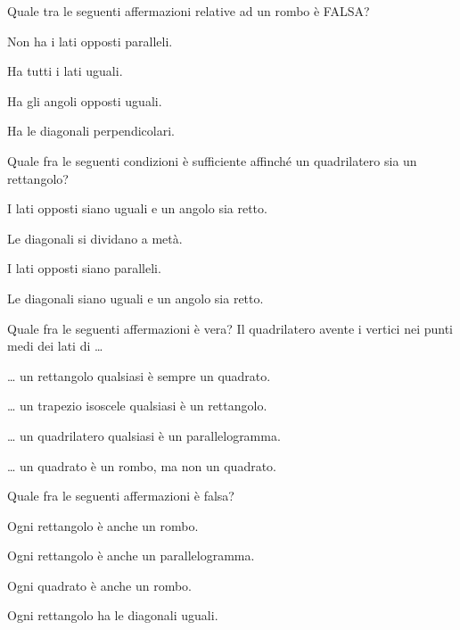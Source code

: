 \begin{esercizio}
\label{ese:4.63}
Quale tra le seguenti affermazioni relative ad un rombo è FALSA?
\begin{multicols}{2}
\begin{enumeratea}
\item Non ha i lati opposti paralleli.
\item Ha tutti i lati uguali.
\item Ha gli angoli opposti uguali.
\item Ha le diagonali perpendicolari.
\end{enumeratea}
\end{multicols}
\end{esercizio}

\begin{esercizio}
\label{ese:4.64}
Quale fra le seguenti condizioni è sufficiente affinché un 
quadrilatero sia un rettangolo?
\begin{enumeratea}
\item I lati opposti siano uguali e un angolo sia retto.
\item Le diagonali si dividano a metà.
\item I lati opposti siano paralleli.
\item Le diagonali siano uguali e un angolo sia retto.
\end{enumeratea}
\end{esercizio}

\begin{esercizio}
\label{ese:4.65}
Quale fra le seguenti affermazioni è vera?
Il quadrilatero avente i vertici nei punti medi dei lati di \ldots{}
\begin{enumeratea}
\item \ldots{} un rettangolo qualsiasi è sempre un quadrato.
\item \ldots{} un trapezio isoscele qualsiasi è un rettangolo.
\item \ldots{} un quadrilatero qualsiasi è un parallelogramma.
\item \ldots{} un quadrato è un rombo, ma non un quadrato.
\end{enumeratea}
\end{esercizio}

\begin{esercizio}
\label{ese:4.66}
Quale fra le seguenti affermazioni è falsa?
\begin{enumeratea}
\item Ogni rettangolo è anche un rombo.
\item Ogni rettangolo è anche un parallelogramma.
\item Ogni quadrato è anche un rombo.
\item Ogni rettangolo ha le diagonali uguali.
\end{enumeratea}
\end{esercizio}


